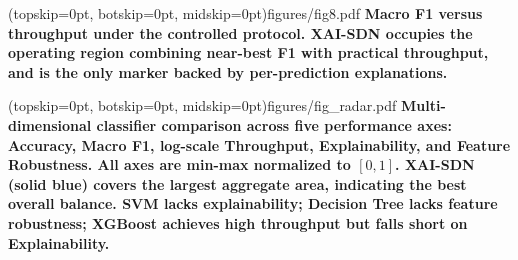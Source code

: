 \documentclass{ieeeaccess}
\begin{document}
\begin{table}
\caption{Comparative performance under the controlled protocol (10K training / 3K test samples, seed = 42). \textcolor{red}
}
\label{tab:comparison}
\end{table}

\Figure[t!](topskip=0pt, botskip=0pt, midskip=0pt){figures/fig8.pdf}
{ \textbf{Macro F1 versus throughput under the controlled protocol. XAI-SDN occupies the operating region combining near-best F1 with practical throughput, and is the only marker backed by per-prediction explanations.}\label{fig:tradeoff}}

\Figure[t!](topskip=0pt, botskip=0pt, midskip=0pt){figures/fig_radar.pdf}
{ \textbf{Multi-dimensional classifier comparison across five performance axes: Accuracy, Macro F1, log-scale Throughput, Explainability, and Feature Robustness. All axes are min-max normalized to $[0,1]$. XAI-SDN (solid blue) covers the largest aggregate area, indicating the best overall balance. SVM lacks explainability; Decision Tree lacks feature robustness; XGBoost achieves high throughput but falls short on Explainability.}\label{fig:radar}}
\end{document}
